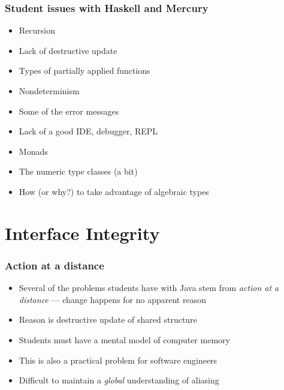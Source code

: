 \documentclass[12pt]{beamer}
\begin{document}
\begin{frame}
\frametitle{Student issues with Haskell and Mercury}
\begin{itemize}
\item Recursion
\item Lack of destructive update
\item Types of partially applied functions
\item Nondeterminism
\item Some of the error messages
\item Lack of a good IDE, debugger, REPL
\item Monads
\item The numeric type classes (a bit)
\item How (or why?) to take advantage of algebraic types
\end{itemize}

\end{frame}


\section{Interface Integrity}

\begin{frame}
\frametitle{Action at a distance}
\begin{itemize}
\item Several of the problems students have with Java stem from
  \emph{action at a distance} --- change happens for no apparent reason
\item Reason is destructive update of shared structure
\item Students must have a mental model of computer memory
\item This is also a practical problem for software engineers
\item Difficult to maintain a \emph{global} understanding of aliasing

\end{itemize}

\end{frame}
\end{document}
